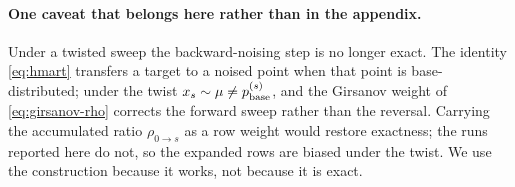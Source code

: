 \paragraph{One caveat that belongs here rather than in the appendix.}
Under a twisted sweep the backward-noising step is no longer exact. The
identity \eqref{eq:hmart} transfers a target to a noised point when that point
is base-distributed; under the twist $x_s\sim\mu\neq p_{\mathrm{base}}^{(s)}$, and the
Girsanov weight of \eqref{eq:girsanov-rho} corrects the forward sweep rather
than the reversal. Carrying the accumulated ratio $\rho_{0\to s}$ as a row
weight would restore exactness; the runs reported here do not, so the expanded
rows are biased under the twist. We use the construction because it works, not
because it is exact.
